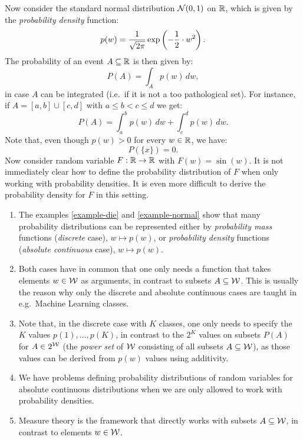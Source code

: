 \begin{Eg}%
    \label{example-normal}
    Now consider the standard normal distribution $\mathcal{N}(0,1)$ on $\mathbb{R}$, which is given by the \emph{probability density} function:
    \[ p(w) = \frac{1}{\sqrt{2 \pi}} \exp\left ( - \frac{1}{2} \cdot w^2 \right ).   \]
    The probability of an event $A \subseteq \mathbb{R}$ is then given by:
    \[ P(A) = \int_A p(w) \, dw,\]
    in case $A$ can be integrated (i.e.\ if it is not a too pathological set).
    For instance, if $A= [a,b] \cup [c,d]$ with $a \le b <c\le d$ we get:
    \[P(A) = \int_a^b p(w)\,dw + \int_c^d p(w)\,dw.\]
    Note that, even though $p(w) >0$ for every $w \in \mathbb{R}$, we have:
\[  P(\{x\}) = 0.\]
Now consider random variable $F: \mathbb{R} \to \mathbb{R}$ with $F(w)=\sin(w)$. 
It is not immediately clear how to define the probability distribution of $F$ when only working with probability densities. It is even more difficult to derive the probability density for $F$ in this setting.
\end{Eg}%

\begin{Disc}%
    \begin{enumerate}
        \item The examples \ref{example-die} and \ref{example-normal} show that many probability distributions can be represented either by \emph{probability mass} functions (\emph{discrete} case), $w \mapsto p(w)$, or \emph{probability density} functions (\emph{absolute continuous} case), $w \mapsto p(w)$.
        \item Both cases have in common that one only needs a function that takes elements $w \in \mathcal{W}$ as arguments, in contrast to subsets $A \subseteq \mathcal{W}$. This is usually the reason why only the discrete and absolute continuous cases are taught in e.g.\ Machine Learning classes.
        \item Note that, in the discrete case with $K$ classes, one only needs to specify the $K$ values $p(1),\dots,p(K)$, in contrast to the $2^K$ values on subsets $P(A)$ for $A \in 2^{\mathcal{W}}$ (the \emph{power set} of $\mathcal{W}$ consisting of all subsets $A \subseteq \mathcal{W}$), as those values can be derived from $p(w)$ values using additivity.
        \item We have problems defining probability distributions of random variables for absolute continuous distributions when we are only allowed to work with probability densities.
        \item Measure theory is the framework that directly works with subsets $A \subseteq \mathcal{W}$, in contrast to elements $w \in \mathcal{W}$.

    \end{enumerate}
\end{Disc}%


